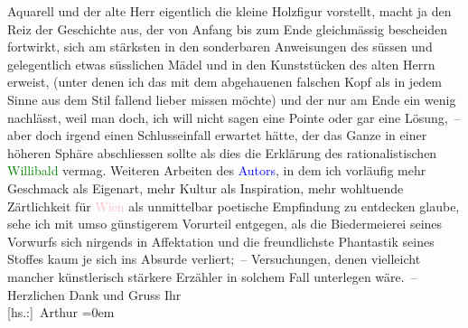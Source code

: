                     Aquarell und der alte Herr eigentlich die kleine Holzfigur vorstellt, macht ja
                    den Reiz der Geschichte aus, der von Anfang bis zum Ende gleichmässig bescheiden
                    fortwirkt, sich am stärksten in den sonderbaren Anweisungen des süssen und
                    gelegentlich etwas süsslichen Mädel und in den Kunststücken des alten {\pb}Herrn erweist, (unter denen ich das mit dem
                    abgehauenen falschen Kopf als in jedem Sinne aus dem Stil fallend lieber missen
                    möchte) und der nur am Ende ein wenig nachlässt, weil man doch, ich will nicht
                    sagen eine Pointe oder gar eine Lösung, – aber doch irgend einen Schlusseinfall
                    erwartet hätte, der das Ganze in einer höheren Sphäre abschliessen sollte als
                    dies die Erklärung des rationalistischen \textcolor{green}{Willibald}{} vermag. Weiteren Arbeiten des \textcolor{blue}{Autors}{}, in dem ich
                    vorläufig mehr Geschmack als Eigenart, mehr Kultur als Inspiration, mehr
                    wohltuende Zärtlichkeit für \textcolor{pink}{Wien}{}\ledrightnote{\textcolor{pink}{Wien}} als unmittelbar
                    poetische Empfindung zu entdecken glaube, sehe ich mit umso günstigerem
                    Vorurteil entgegen, als die Biedermeierei seines Vorwurfs \introOben{}sich\introOben{} nirgends in Affektation und die freundlichste Phantastik seines
                    Stoffes kaum je sich ins Absurde verliert; – Versuchungen, denen vielleicht
                    mancher künstlerisch stärkere Erzähler in solchem Fall unterlegen wäre. –
                    Herzlichen Dank und Gruss\pend
           \pstart
           Ihr{\\[\baselineskip]}\spacefill\mbox{{[}hs.:{]} Arthur}\pend
           \leftskip=0em{}\endnumbering{}  
      
